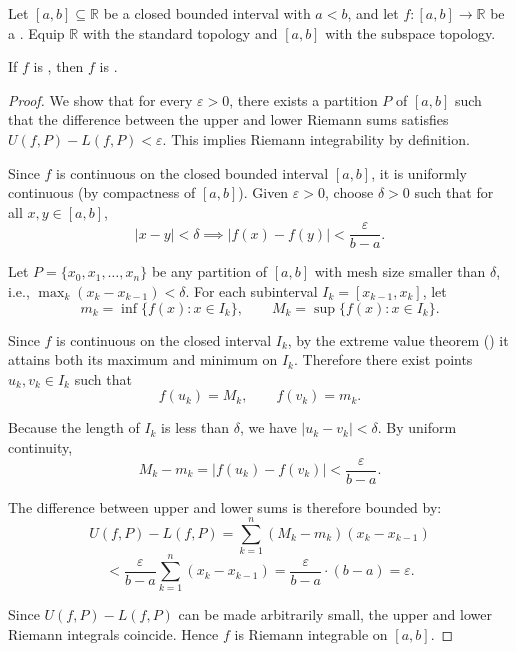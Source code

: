\begin{proposition} \label{proposition:continuous_functions_are_riemann_integrable_on_closed_intervals}
    Let $[a, b] \subseteq \mathbb{R}$ be a closed bounded interval with $a < b$, and let $f : [a, b] \to \mathbb{R}$ be a . Equip $\mathbb{R}$ with the standard topology and $[a, b]$ with the subspace topology.

    If $f$ is , then $f$ is .
\end{proposition}
\begin{proof}
    We show that for every $\varepsilon > 0$, there exists a partition $P$ of $[a, b]$ such that the difference between the upper and lower Riemann sums satisfies $U(f,P) - L(f,P) < \varepsilon$. This implies Riemann integrability by definition.

    Since $f$ is continuous on the closed bounded interval $[a, b]$, it is uniformly continuous (by compactness of $[a, b]$). Given $\varepsilon > 0$, choose $\delta > 0$ such that for all $x, y \in [a, b]$,
    $$|x - y| < \delta \implies |f(x) - f(y)| < \frac{\varepsilon}{b-a}.$$

    Let $P = \{x_0, x_1, \dots, x_n\}$ be any partition of $[a, b]$ with mesh size smaller than $\delta$, i.e., $\max_k (x_k - x_{k-1}) < \delta$. For each subinterval $I_k = [x_{k-1}, x_k]$, let
    $$m_k = \inf\{f(x) : x \in I_k\}, \qquad M_k = \sup\{f(x) : x \in I_k\}.$$

    Since $f$ is continuous on the closed interval $I_k$, by the extreme value theorem () it attains both its maximum and minimum on $I_k$. Therefore there exist points $u_k, v_k \in I_k$ such that
    $$f(u_k) = M_k, \qquad f(v_k) = m_k.$$

    Because the length of $I_k$ is less than $\delta$, we have $|u_k - v_k| < \delta$. By uniform continuity,
    $$M_k - m_k = |f(u_k) - f(v_k)| < \frac{\varepsilon}{b-a}.$$

    The difference between upper and lower sums is therefore bounded by:
    $$U(f,P) - L(f,P) = \sum_{k=1}^n (M_k - m_k)(x_k - x_{k-1})$$
    $$< \frac{\varepsilon}{b-a} \sum_{k=1}^n (x_k - x_{k-1}) = \frac{\varepsilon}{b-a} \cdot (b-a) = \varepsilon.$$

    Since $U(f,P) - L(f,P)$ can be made arbitrarily small, the upper and lower Riemann integrals coincide. Hence $f$ is Riemann integrable on $[a, b]$.
\end{proof}
